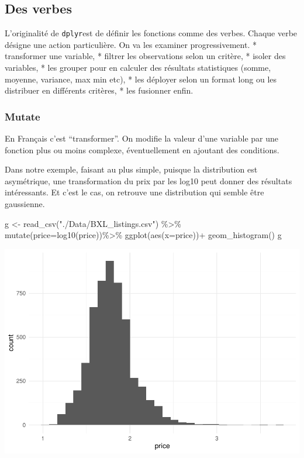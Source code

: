 \documentclass[
]{book}
\newenvironment{Shaded}{\begin{snugshade}}{\end{snugshade}}
\newcommand{\AttributeTok}[1]{\textcolor[rgb]{0.77,0.63,0.00}{#1}}
\newcommand{\FunctionTok}[1]{\textcolor[rgb]{0.00,0.00,0.00}{#1}}
\newcommand{\NormalTok}[1]{#1}
\newcommand{\OtherTok}[1]{\textcolor[rgb]{0.56,0.35,0.01}{#1}}
\newcommand{\SpecialCharTok}[1]{\textcolor[rgb]{0.00,0.00,0.00}{#1}}
\newcommand{\StringTok}[1]{\textcolor[rgb]{0.31,0.60,0.02}{#1}}
\begin{document}
\hypertarget{des-verbes}{%
\subsection{Des verbes}\label{des-verbes}}

L'originalité de \texttt{dplyr}est de définir les fonctions comme des verbes. Chaque verbe désigne une action particulière. On va les examiner progressivement.
* transformer une variable,
* filtrer les observations selon un critère,
* isoler des variables,
* les grouper pour en calculer des résultats statistiques (somme, moyenne, variance, max min etc),
* les déployer selon un format long ou les distribuer en différents critères,
* les fusionner enfin.

\hypertarget{mutate}{%
\subsubsection{Mutate}\label{mutate}}

En Français c'est ``transformer''. On modifie la valeur d'une variable par une fonction plus ou moins complexe, éventuellement en ajoutant des conditions.

Dans notre exemple, faisant au plus simple, puisque la distribution est asymétrique, une transformation du prix par les log10 peut donner des résultats intéressants. Et c'est le cas, on retrouve une distribution qui semble être gaussienne.

\begin{Shaded}
\begin{Highlighting}[]
\NormalTok{g }\OtherTok{\textless{}{-}} \FunctionTok{read\_csv}\NormalTok{(}\StringTok{"./Data/BXL\_listings.csv"}\NormalTok{) }\SpecialCharTok{\%\textgreater{}\%} 
  \FunctionTok{mutate}\NormalTok{(}\AttributeTok{price=}\FunctionTok{log10}\NormalTok{(price))}\SpecialCharTok{\%\textgreater{}\%}
  \FunctionTok{ggplot}\NormalTok{(}\FunctionTok{aes}\NormalTok{(}\AttributeTok{x=}\NormalTok{price))}\SpecialCharTok{+}
  \FunctionTok{geom\_histogram}\NormalTok{()}
\NormalTok{g}
\end{Highlighting}
\end{Shaded}

\includegraphics{bookdown-demo_files/figure-latex/0204-1.pdf}
\end{document}
